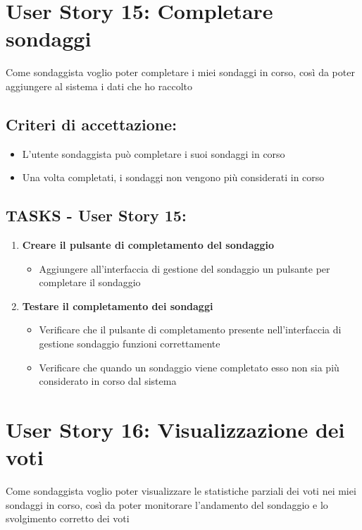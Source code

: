 \section*{User Story 15: Completare sondaggi}
    Come sondaggista voglio poter completare i miei sondaggi in corso, così da poter aggiungere al sistema i dati che ho raccolto
    \subsection*{Criteri di accettazione:}  
    \begin{itemize}  
        \item L'utente sondaggista può completare i suoi sondaggi in corso
        \item Una volta completati, i sondaggi non vengono più considerati in corso
    \end{itemize}  
    \subsection*{TASKS - User Story 15:}  
    \begin{enumerate}  
        \item \textbf{Creare il pulsante di completamento del sondaggio}  
            \begin{itemize}  
                \item Aggiungere all'interfaccia di gestione del sondaggio un pulsante per completare il sondaggio
            \end{itemize} 
        \item \textbf{Testare il completamento dei sondaggi}  
            \begin{itemize}  
                \item Verificare che il pulsante di completamento presente nell'interfaccia di gestione sondaggio funzioni correttamente
                \item Verificare che quando un sondaggio viene completato esso non sia più considerato in corso dal sistema
            \end{itemize} 
    \end{enumerate}
\section*{User Story 16: Visualizzazione dei voti}
    Come sondaggista voglio poter visualizzare le statistiche parziali dei voti nei miei sondaggi in corso, così da poter monitorare l'andamento del sondaggio e lo svolgimento corretto dei voti
